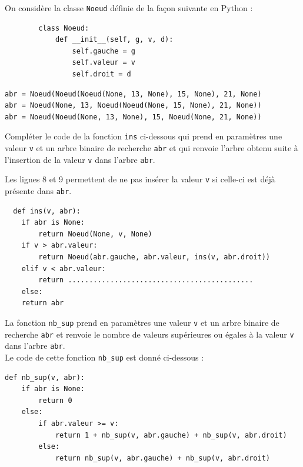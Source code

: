 \documentclass[a4paper,12pt,article,firamath]{nsi}
\begin{document}
On considère la classe \texttt{Noeud} définie de la façon suivante en Python :


\begin{verbatim}
        class Noeud:
            def __init__(self, g, v, d):
                self.gauche = g
                self.valeur = v
                self.droit = d
\end{verbatim}



\begin{verbatim}
abr = Noeud(Noeud(Noeud(None, 13, None), 15, None), 21, None)
abr = Noeud(None, 13, Noeud(Noeud(None, 15, None), 21, None))
abr = Noeud(Noeud(None, 13, None), 15, Noeud(None, 21, None)) 
\end{verbatim}

\question Compléter le code de la fonction \texttt{ins} ci-dessous qui
prend en paramètres une valeur \texttt{v} et un arbre binaire de recherche \texttt{abr} et qui
renvoie l’arbre obtenu suite à l’insertion de la valeur \texttt{v} dans l’arbre \texttt{abr}.

Les lignes 8 et 9 permettent de ne pas insérer la valeur \texttt{v} si celle-ci est déjà présente dans \texttt{abr}.


\begin{verbatim}
  def ins(v, abr):
    if abr is None:
        return Noeud(None, v, None)
    if v > abr.valeur:
        return Noeud(abr.gauche, abr.valeur, ins(v, abr.droit))
    elif v < abr.valeur:
        return ............................................
    else:
    return abr      
\end{verbatim}

La fonction \texttt{nb_sup} prend en paramètres une valeur \texttt{v} et un arbre binaire de recherche \texttt{abr} et renvoie le nombre de valeurs supérieures ou égales à la valeur \texttt{v} dans l’arbre \texttt{abr}.\\

Le code de cette fonction \texttt{nb_sup} est donné ci-dessous :

\begin{verbatim}
def nb_sup(v, abr):
    if abr is None:
        return 0
    else:
        if abr.valeur >= v:
            return 1 + nb_sup(v, abr.gauche) + nb_sup(v, abr.droit)
        else:
            return nb_sup(v, abr.gauche) + nb_sup(v, abr.droit)
\end{verbatim}
\end{document}
